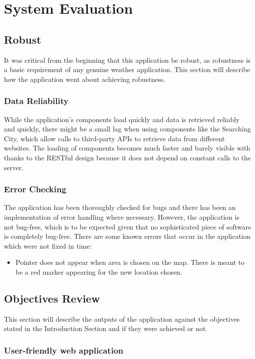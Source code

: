 \chapter{System Evaluation}
\section{Robust}
It was critical from the beginning that this application be robust, as robustness is a basic requirement of any genuine weather application. This section will describe how the application went about achieving robustness.

\subsection{Data Reliability}
While the application's components load quickly and data is retrieved reliably and quickly, there might be a small lag when using components like the Searching City, which allow calls to third-party APIs to retrieve data from different websites. The loading of components becomes much faster and barely visible with thanks to the RESTful design because it does not depend on constant calls to the server.

\subsection{Error Checking}
The application has been thoroughly checked for bugs and there has been an implementation of error handling where necessary. However, the application is not bug-free, which is to be expected given that no sophisticated piece of software is completely bug-free. There are some known errors that occur in the application which were not fixed in time:

\begin{itemize}
    \item Pointer does not appear when area is chosen on the map. There is meant to be a red marker appearing for the new location chosen. 
\end{itemize}

\section{Objectives Review}
This section will describe the outputs of the application against the objectives stated in the Introduction Section and if they were achieved or not.

\subsection{User-friendly web application}

